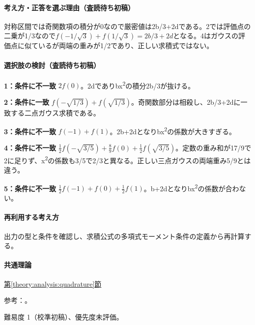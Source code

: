 \paragraph{考え方・正答を選ぶ理由（査読待ち初稿）} 対称区間では奇関数項の積分が0なので厳密値は2b/3+2dである。2では評価点の二乗が1/3なので\(f(-1/\sqrt3)+f(1/\sqrt3)=2b/3+2d\)となる。4はガウスの評価点に似ているが両端の重みが1/2であり、正しい求積式ではない。

\paragraph{選択肢の検討（査読待ち初稿）}\mbox{}\par

\noindent\textbf{1：条件に不一致} \(2f(0)\)。2dでありbx\textsuperscript{2}の積分2b/3が抜ける。\par

\noindent\textbf{2：条件に一致} \(f(-\sqrt{1/3})+f(\sqrt{1/3})\)。奇関数部分は相殺し、2b/3+2dに一致する二点ガウス求積である。\par

\noindent\textbf{3：条件に不一致} \(f(-1)+f(1)\)。2b+2dとなりbx\textsuperscript{2}の係数が大きすぎる。\par

\noindent\textbf{4：条件に不一致} \(\frac12f(-\sqrt{3/5})+\frac89f(0)+\frac12f(\sqrt{3/5})\)。定数の重み和が17/9で2に足りず、x\textsuperscript{2}の係数も3/5で2/3と異なる。正しい三点ガウスの両端重み5/9とは違う。\par

\noindent\textbf{5：条件に不一致} \(\frac12f(-1)+f(0)+\frac12f(1)\)。b+2dとなりbx\textsuperscript{2}の係数が合わない。\par

\paragraph{再利用する考え方} 出力の型と条件を確認し、求積公式の多項式モーメント条件の定義から再計算する。

\paragraph{共通理論} \hyperref[theory:analysis:quadrature]{第\ref*{theory:analysis:quadrature}節}

\par 参考：\cite{nist_quadrature}。

\par 難易度 1（校準初稿）、優先度未評価。

